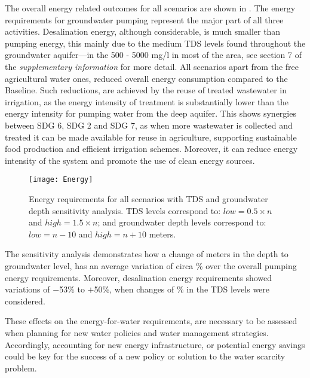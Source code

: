 The overall energy related outcomes for all scenarios are shown in . The energy requirements for groundwater pumping represent the major part of all three activities. Desalination energy, although considerable, is much smaller than pumping energy, this mainly due to the medium TDS levels found throughout the groundwater aquifer---in the 500 - 5000 mg/l in most of the area, see section 7 of the \textit{supplementary information} for more detail. All scenarios apart from the free agricultural water ones, reduced overall energy consumption compared to the Baseline. Such reductions, are achieved by the reuse of treated wastewater in irrigation, as the energy intensity of treatment is substantially lower than the energy intensity for pumping water from the deep aquifer. This shows synergies between SDG 6, SDG 2 and SDG 7, as when more wastewater is collected and treated it can be made available for reuse in agriculture, supporting sustainable food production and efficient irrigation schemes. Moreover, it can reduce energy intensity of the system and promote the use of clean energy sources.

\begin{figure*}[!t]
\texttt{[image: Energy]}
\caption{Energy requirements for all scenarios with TDS and groundwater depth sensitivity analysis. TDS levels correspond to: $low=0.5\times n$ and $high=1.5\times n$; and groundwater depth levels correspond to: $low=n-10$ and $high=n+10$ meters.}
\label{fig:energy}
\end{figure*}

The sensitivity analysis demonstrates how a change of  meters in the depth to groundwater level, has an average variation of circa \% over the overall pumping energy requirements. Moreover, desalination energy requirements showed variations of $-$53\% to $+$50\%, when changes of \% in the TDS levels were considered.

These effects on the energy-for-water requirements, are necessary to be assessed when planning for new water policies and water management strategies. Accordingly, accounting for new energy infrastructure, or potential energy savings could be key for the success of a new policy or solution to the water scarcity problem.